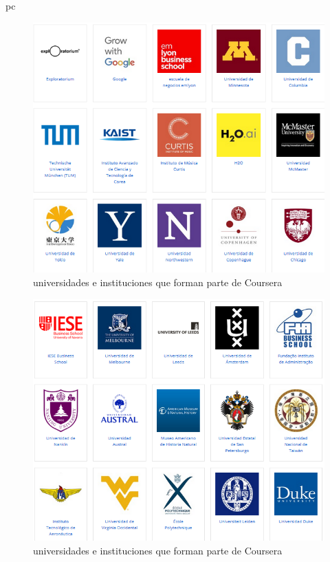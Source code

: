 pc\documentclass[a4paper,12pt,openany]{book}
\begin{document}
\begin{figure}[H]
  \centering
	\includegraphics[width=12cm]{coursera10-3.png}
\caption{universidades e instituciones que forman parte de Coursera}
  \label{fig:cour10-3}
\end{figure}

\begin{figure}[H]
  \centering
	\includegraphics[width=12cm]{coursera10-4.png}
\caption{universidades e instituciones que forman parte de Coursera}
  \label{fig:cour10-4}
\end{figure}
\end{document}
